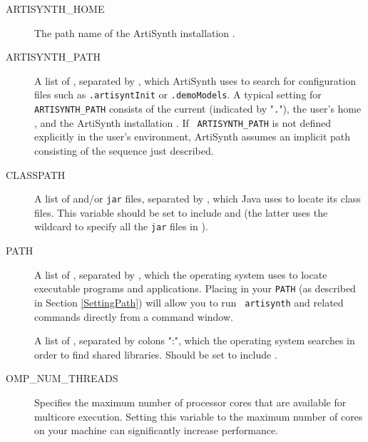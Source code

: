 \begin{description}

\item[ARTISYNTH\_HOME]\mbox{}
 
The path name of the ArtiSynth installation \directory{}.

\item[ARTISYNTH\_PATH]\mbox{}

A list of \directories{}, separated by \separatorDesc, which ArtiSynth
uses to search for configuration files such as {\tt .artisyntInit} or
{\tt .demoModels}.  A typical setting for {\tt ARTISYNTH\_PATH}
consists of the current \directory{} (indicated by "{\tt .}"), the user's
home \directory{}, and the ArtiSynth installation \directory{}. If {\tt
ARTISYNTH\_PATH} is not defined explicitly in the user's environment,
ArtiSynth assumes an implicit path consisting of the \directory{}
sequence just described.

\item[CLASSPATH]\mbox{}

A list of \directories{} and/or {\tt jar} files, separated by
\separatorDesc, which Java uses to locate its class files. This
variable should be set to include 
and  (the latter uses the
wildcard {\tt *} to specify all the {\tt jar} files in 
).

\item[PATH]\mbox{}
 
A list of \directories{}, separated by \separatorDesc, which the
operating system uses to locate executable programs and
applications. Placing  in your {\tt PATH} (as
described in Section \ref{SettingPath}) will allow you to run {\tt
artisynth} and related commands directly from a command window.

\ifNeedLibraryPath
\ifWindows\else %
\item[\LIBRARYPATH{}]\mbox{}

A list of \directories{}, separated by colons
":", which the operating system searches in order to find shared libraries.
Should be set to include .
\fi %
\fi %

\item[OMP\_NUM\_THREADS]\mbox{}
 
Specifies the maximum number of processor cores that are available for
multicore execution. Setting this variable to the maximum number of
cores on your machine can significantly increase performance.

\end{description}

